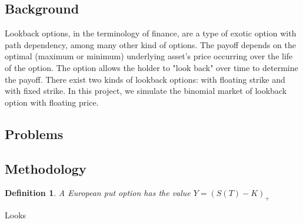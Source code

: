 \subsection{Background}
Lookback options, in the terminology of finance, are a type of exotic option with path dependency, among many other kind of options. The payoff depends on the optimal (maximum or minimum) underlying asset's price occurring over the life of the option. The option allows the holder to "look back" over time to determine the payoff. There exist two kinds of lookback options: with floating strike and with fixed strike. In this project, we simulate the binomial market of lookback option with floating price.

\subsection{Problems}


\subsection{Methodology}

\newtheorem{definition}{Definition}[section]

\begin{definition}
A European put option has the value $Y = (S(T) - K)_+$
\end{definition}

\begin{theorem}
Looks
\end{theorem}